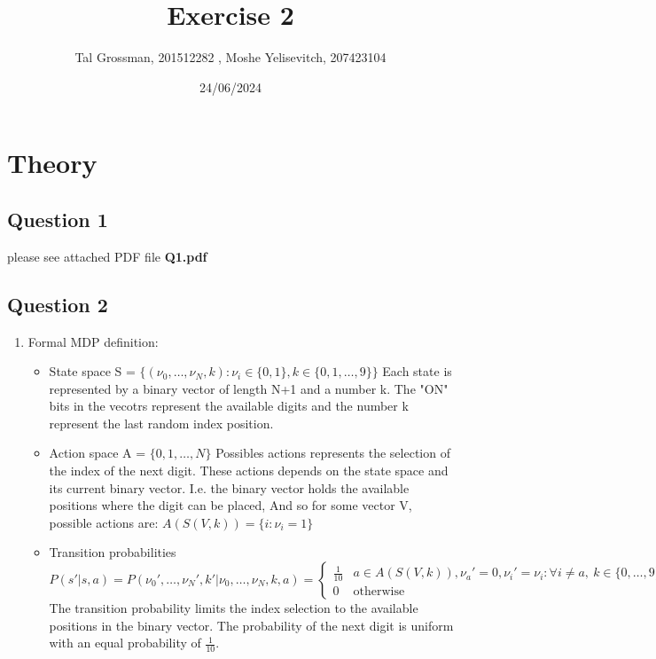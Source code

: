 \documentclass{assignmeownt}
\title{Exercise 2}
\author{Tal Grossman, 201512282 , Moshe Yelisevitch, 207423104}
\date{24/06/2024}
\begin{document}
\maketitle
\thispagestyle{firststyle}
\section{Theory}
\subsection{Question 1}
please see attached PDF file \textbf{Q1.pdf}

\subsection{Question 2}
\begin{enumerate} %
\item Formal MDP definition:
\newline
\begin{itemize} %

\item State space
S = $\{(\nu_0, \dots, \nu_{N}, k) : \nu_i \in \{0, 1\}, k \in \{0, 1,  \dots, 9\}\}$
\newline
Each state is represented by a binary vector of length N+1 and a number k. The "ON" bits in the vecotrs represent the available digits and the number k represent the last random index position.
\newline

\item Action space
A = $\{0, 1, \dots, N\}$
\newline
Possibles actions represents the selection of the index of the next digit. These actions depends on the state space and its current binary vector.
\newline
I.e. the binary vector holds the available positions where the digit can be placed, And so for some vector V, possible actions are: $A(S(V, k)) = \{i : \nu_i = 1\}$

\item Transition probabilities
\newline
$$
P(s' | s, a) = P(\nu_0', \dots, \nu_{N}', k' | \nu_0, \dots, \nu_{N}, k, a) = 
\begin{cases} 
\frac{1}{10} &  a \in A(S(V, k)), \nu_{a}'=0, \nu_{i}'=\nu_{i} : \forall{i}\neq{a},\ k \in\{0, \dots, 9\}   \\
0 & \text{otherwise}
\end{cases}
$$
\newline
The transition probability limits the index selection to the available positions in the binary vector. The probability of the next digit is uniform with an equal probability of $\frac{1}{10}$.


\end{itemize}
\end{enumerate}
\end{document}
